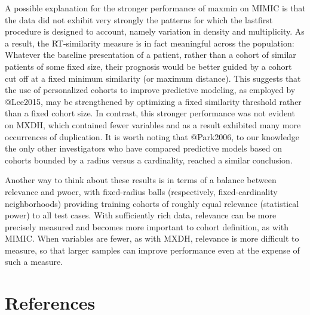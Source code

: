 \documentclass[
]{article}
\begin{document}
A possible explanation for the stronger performance of maxmin on MIMIC
is that the data did not exhibit very strongly the patterns for which
the lastfirst procedure is designed to account, namely variation in
density and multiplicity. As a result, the RT-similarity measure is in
fact meaningful across the population: Whatever the baseline
presentation of a patient, rather than a cohort of similar patients of
some fixed size, their prognosis would be better guided by a cohort cut
off at a fixed minimum similarity (or maximum distance). This suggests
that the use of personalized cohorts to improve predictive modeling, as
employed by @Lee2015, may be strengthened by optimizing a fixed
similarity threshold rather than a fixed cohort size. In contrast, this
stronger performance was not evident on MXDH, which contained fewer
variables and as a result exhibited many more occurrences of
duplication. It is worth noting that @Park2006, to our knowledge the
only other investigators who have compared predictive models based on
cohorts bounded by a radius versus a cardinality, reached a similar
conclusion.

Another way to think about these results is in terms of a balance
between relevance and pwoer, with fixed-radius balls (respectively,
fixed-cardinality neighborhoods) providing training cohorts of roughly
equal relevance (statistical power) to all test cases. With sufficiently
rich data, relevance can be more precisely measured and becomes more
important to cohort definition, as with MIMIC. When variables are fewer,
as with MXDH, relevance is more difficult to measure, so that larger
samples can improve performance even at the expense of such a measure.

\hypertarget{references}{%
\section{References}\label{references}}
\end{document}
